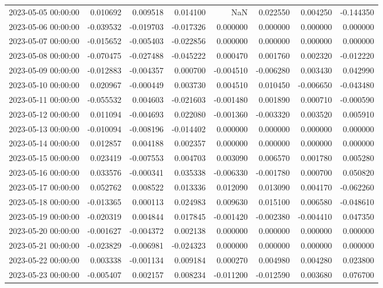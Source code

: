 \begin{tabular}{lrrrrrrr}
2023-05-05 00:00:00 & 0.010692 & 0.009518 & 0.014100 & NaN & 0.022550 & 0.004250 & -0.144350 \\
2023-05-06 00:00:00 & -0.039532 & -0.019703 & -0.017326 & 0.000000 & 0.000000 & 0.000000 & 0.000000 \\
2023-05-07 00:00:00 & -0.015652 & -0.005403 & -0.022856 & 0.000000 & 0.000000 & 0.000000 & 0.000000 \\
2023-05-08 00:00:00 & -0.070475 & -0.027488 & -0.045222 & 0.000470 & 0.001760 & 0.002320 & -0.012220 \\
2023-05-09 00:00:00 & -0.012883 & -0.004357 & 0.000700 & -0.004510 & -0.006280 & 0.003430 & 0.042990 \\
2023-05-10 00:00:00 & 0.020967 & -0.000449 & 0.003730 & 0.004510 & 0.010450 & -0.006650 & -0.043480 \\
2023-05-11 00:00:00 & -0.055532 & 0.004603 & -0.021603 & -0.001480 & 0.001890 & 0.000710 & -0.000590 \\
2023-05-12 00:00:00 & 0.011094 & -0.004693 & 0.022080 & -0.001360 & -0.003320 & 0.003520 & 0.005910 \\
2023-05-13 00:00:00 & -0.010094 & -0.008196 & -0.014402 & 0.000000 & 0.000000 & 0.000000 & 0.000000 \\
2023-05-14 00:00:00 & 0.012857 & 0.004188 & 0.002357 & 0.000000 & 0.000000 & 0.000000 & 0.000000 \\
2023-05-15 00:00:00 & 0.023419 & -0.007553 & 0.004703 & 0.003090 & 0.006570 & 0.001780 & 0.005280 \\
2023-05-16 00:00:00 & 0.033576 & -0.000341 & 0.035338 & -0.006330 & -0.001780 & 0.000700 & 0.050820 \\
2023-05-17 00:00:00 & 0.052762 & 0.008522 & 0.013336 & 0.012090 & 0.013090 & 0.004170 & -0.062260 \\
2023-05-18 00:00:00 & -0.013365 & 0.000113 & 0.024983 & 0.009630 & 0.015100 & 0.006580 & -0.048610 \\
2023-05-19 00:00:00 & -0.020319 & 0.004844 & 0.017845 & -0.001420 & -0.002380 & -0.004410 & 0.047350 \\
2023-05-20 00:00:00 & -0.001627 & -0.004372 & 0.002138 & 0.000000 & 0.000000 & 0.000000 & 0.000000 \\
2023-05-21 00:00:00 & -0.023829 & -0.006981 & -0.024323 & 0.000000 & 0.000000 & 0.000000 & 0.000000 \\
2023-05-22 00:00:00 & 0.003338 & -0.001134 & 0.009184 & 0.000270 & 0.004980 & 0.004280 & 0.023800 \\
2023-05-23 00:00:00 & -0.005407 & 0.002157 & 0.008234 & -0.011200 & -0.012590 & 0.003680 & 0.076700 \\

\end{tabular}
